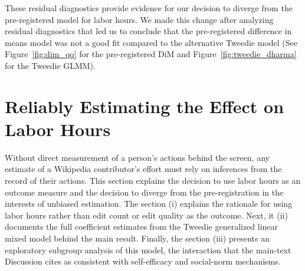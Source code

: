 \documentclass[9pt,twoside,lineno]{pnas-new}
\begin{document}
These residual diagnostics provide evidence for our decision to diverge from the pre-registered model for labor hours. We made this change after analyzing residual diagnostics that led us to conclude that the pre-registered difference in means model was not a good fit compared to the alternative Tweedie model (See Figure~\ref{fig:dim_qq} for the pre-registered DiM and Figure~\ref{fig:tweedie_dharma} for the Tweedie GLMM).


\section*{Reliably Estimating the Effect on Labor Hours}
Without direct measurement of a person's actions behind the screen, any estimate of a Wikipedia contributor's effort must rely on inferences from the record of their actions. This section explains the decision to use labor hours as an outcome measure and the decision to diverge from the pre-registration in the interests of unbiased estimation. The section (i) explains the rationale for using labor hours rather than edit count or edit quality as the outcome. Next, it (ii) documents the full coefficient estimates from the Tweedie generalized linear mixed model behind the main result. Finally, the section (iii) presents an exploratory subgroup analysis of this model, the interaction that the main-text Discussion cites as consistent with self-efficacy and social-norm mechanisms.

\end{document}
